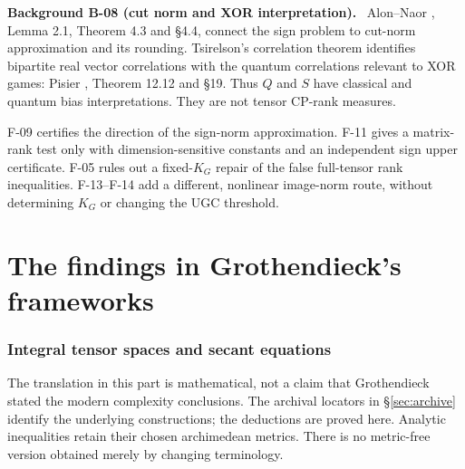 \documentclass[11pt]{article}
\newenvironment{background}[2]{\par\medskip\noindent\textbf{Background #1 (#2).}\ }{\par\medskip}
\begin{document}
\begin{background}{B-08}{cut norm and XOR interpretation}
Alon--Naor \cite{AN}, Lemma 2.1, Theorem 4.3 and \S4.4,
connect the sign problem to cut-norm approximation and its
rounding. Tsirelson's correlation theorem identifies bipartite
real vector correlations with the quantum correlations relevant
to XOR games: Pisier \cite{Pis}, Theorem 12.12 and \S19.
Thus $Q$ and $S$ have classical and quantum bias interpretations.
They are not tensor CP-rank measures.
\end{background}
F-09 certifies the direction of the sign-norm approximation.
F-11 gives a matrix-rank test only with dimension-sensitive
constants and an independent sign upper certificate.
F-05 rules out a fixed-$K_G$ repair of the false full-tensor
rank inequalities. F-13--F-14 add a different, nonlinear
image-norm route, without determining $K_G$ or changing
the UGC threshold.

\part{The findings in Grothendieck's frameworks}
\section{Integral tensor spaces and secant equations}
The translation in this part is mathematical, not a claim that
Grothendieck stated the modern complexity conclusions. The archival
locators in \S\ref{sec:archive} identify the underlying constructions;
the deductions are proved here. Analytic inequalities retain their
chosen archimedean metrics. There is no metric-free version obtained
merely by changing terminology.
\end{document}

